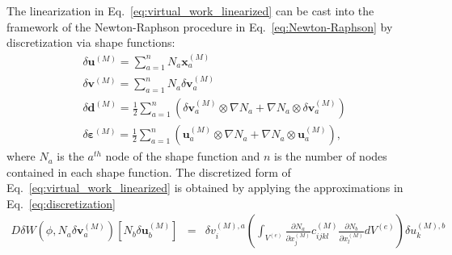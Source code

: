 \documentclass[12pt,aps,pre]{revtex4}
\begin{document}
The linearization in Eq.\ \eqref{eq:virtual_work_linearized} can be cast into the framework of the Newton-Raphson procedure in Eq.\ \eqref{eq:Newton-Raphson} by discretization via shape functions:
%
\begin{align}
&\delta \pmb{u}^{(M)} = \sum_{a=1}^n N_a \pmb{x}_a^{(M)} \nonumber\\
%
&\delta \pmb{v}^{(M)} = \sum_{a=1}^n N_a \delta \pmb{v}_a^{(M)} \nonumber\\
%
&\delta \pmb{d}^{(M)} = \frac{1}{2} \sum_{a=1}^n (\delta \pmb{v}_a^{(M)} \otimes \nabla N_a + \nabla N_a \otimes \delta \pmb{v}_a^{(M)}) \nonumber\\
%
&\delta \pmb{\varepsilon}^{(M)} = \frac{1}{2} \sum_{a=1}^n (\pmb{u}_a^{(M)} \otimes \nabla N_a + \nabla N_a \otimes \pmb{u}_a^{(M)}),
\label{eq:discretization}
\end{align}
%
where $N_a$ is the $a^{th}$ node of the shape function and $n$ is the number of nodes contained in each shape function. The discretized form of Eq.\ \eqref{eq:virtual_work_linearized} is obtained by applying the approximations in Eq.\ \eqref{eq:discretization}
%
\begin{eqnarray}
D\delta W(\phi,N_a\delta \pmb{v}_a^{(M)})[N_b\delta \pmb{u}_b^{(M)}] &=& \delta v_i^{(M),a}\left(\int_{V^{(e)}}\frac{\partial N_a}{\partial x_j^{(M)}} c_{ijkl}^{(M)} \frac{\partial N_b}{\partial x_l^{(M)}} dV^{(e)} \right) \delta u_k^{(M),b} 
\end{eqnarray}
%
\end{document}
